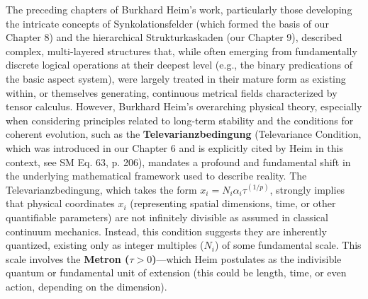 \documentclass[12pt]{article}
\newcommand{\metron}{\tau}
\begin{document}
The preceding chapters of Burkhard Heim's work, particularly those developing the intricate concepts of Synkolationsfelder (which formed the basis of our Chapter 8) and the hierarchical Strukturkaskaden (our Chapter 9), described complex, multi-layered structures that, while often emerging from fundamentally discrete logical operations at their deepest level (e.g., the binary predications of the basic aspect system), were largely treated in their mature form as existing within, or themselves generating, continuous metrical fields characterized by tensor calculus. However, Burkhard Heim’s overarching physical theory, especially when considering principles related to long-term stability and the conditions for coherent evolution, such as the \textbf{Televarianzbedingung} (Televariance Condition, which was introduced in our Chapter 6 and is explicitly cited by Heim in this context, see SM Eq. 63, p. 206), mandates a profound and fundamental shift in the underlying mathematical framework used to describe reality. The Televarianzbedingung, which takes the form \( x_i = N_i \alpha_i \tau^{(1/p)} \), strongly implies that physical coordinates \( x_i \) (representing spatial dimensions, time, or other quantifiable parameters) are not infinitely divisible as assumed in classical continuum mechanics. Instead, this condition suggests they are inherently quantized, existing only as integer multiples (\( N_i \)) of some fundamental scale. This scale involves the \textbf{Metron (\( \metron > 0 \))}—which Heim postulates as the indivisible quantum or fundamental unit of extension (this could be length, time, or even action, depending on the dimension).
\end{document}
